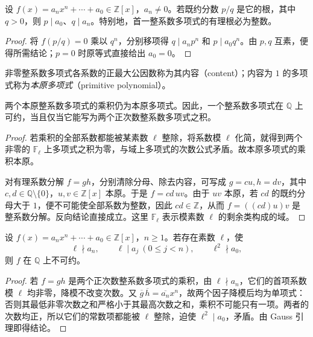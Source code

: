 \begin{theorem}[有理根的必要条件]
\label{thm:poly-rational-root}
设 $f(x)=a_nx^n+\cdots+a_0\in\mathbb Z[x]$，$a_n\ne0$。若既约分数 $p/q$ 是它的根，其中 $q>0$，则 $p\mid a_0$、$q\mid a_n$。特别地，首一整系数多项式的有理根必为整数。
\end{theorem}
\begin{proof}
将 $f(p/q)=0$ 乘以 $q^n$，分别移项得 $q\mid a_np^n$ 和 $p\mid a_0q^n$。由 $p,q$ 互素，便得所需结论；$p=0$ 时原等式直接给出 $a_0=0$。
\end{proof}

\begin{definition}
非零整系数多项式各系数的正最大公因数称为其内容（content）；内容为 $1$ 的多项式称为\emph{本原多项式}（primitive polynomial）。
\end{definition}

\begin{lemma}[Gauss 引理]
\label{lem:poly-gauss}
两个本原整系数多项式的乘积仍为本原多项式。因此，一个整系数多项式在 $\mathbb Q$ 上可约，当且仅当它能写为两个正次数整系数多项式之积。
\end{lemma}
\begin{proof}
若乘积的全部系数都能被某素数 $\ell$ 整除，将系数模 $\ell$ 化简，就得到两个非零的 $\mathbb F_\ell$ 上多项式之积为零，与域上多项式的次数公式矛盾。故本原多项式的乘积本原。

对有理系数分解 $f=gh$，分别清除分母、除去内容，可写成 $g=cu,h=dv$，其中 $c,d\in\mathbb Q\setminus\{0\}$，$u,v\in\mathbb Z[x]$ 本原。于是 $f=cd\,uv$。由于 $uv$ 本原，若 $cd$ 的既约分母大于 $1$，便不可能使全部系数为整数，因此 $cd\in\mathbb Z$，从而 $f=((cd)u)v$ 是整系数分解。反向结论直接成立。这里 $\mathbb F_\ell$ 表示模素数 $\ell$ 的剩余类构成的域。
\end{proof}

\begin{theorem}
\label{thm:poly-eisenstein}
设 $f(x)=a_nx^n+\cdots+a_0\in\mathbb Z[x]$，$n\geq1$。若存在素数 $\ell$，使
\[
    \ell\nmid a_n,\qquad \ell\mid a_j\ (0\leq j<n),
    \qquad \ell^2\nmid a_0,
\]
则 $f$ 在 $\mathbb Q$ 上不可约。
\end{theorem}
\begin{proof}
若 $f=gh$ 是两个正次数整系数多项式的乘积，由 $\ell\nmid a_n$，它们的首项系数模 $\ell$ 均非零，降模不改变次数。又 $\overline g\,\overline h=\overline{a_n}x^n$，故两个因子降模后均为单项式：否则其最低非零次数之和严格小于其最高次数之和，乘积不可能只有一项。两者的次数均正，所以它们的常数项都能被 $\ell$ 整除，迫使 $\ell^2\mid a_0$，矛盾。由 Gauss 引理即得结论。
\end{proof}

